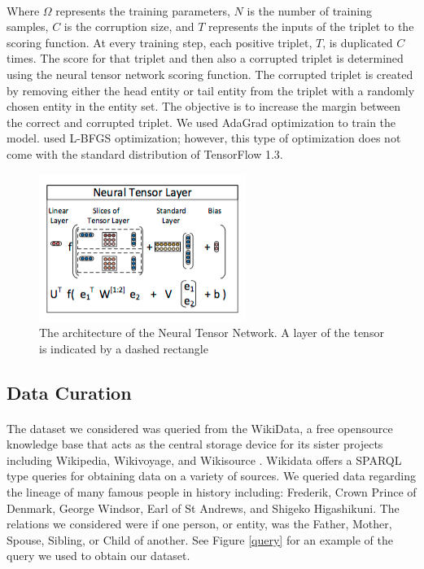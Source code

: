 \documentclass[11.5pt]{article}
\newcounter{Figure}
\newcounter{graphics}
\begin{document}
\paragraph{}  Where $ \Omega $ represents the training parameters, $N$ is the number of training samples, $C$ is the corruption size, and $T$ represents the inputs of the triplet to the scoring function. At every training step, each positive triplet, $T$, is duplicated $C$ times. The score for that triplet and then also a corrupted triplet is determined using the neural tensor network scoring function. The corrupted triplet is created by removing either the head entity or tail entity from the triplet with a randomly chosen entity in the entity set. The objective is to increase the margin between the correct and corrupted triplet. We used AdaGrad optimization to train the model. \cite{socher2013reasoning} used L-BFGS optimization; however, this type of optimization does not come with the standard distribution of TensorFlow 1.3.

 \begin{figure}[h!]
\centerline { \includegraphics[width=.5\textwidth]{report_ntn/ntn_arch.png}}
  \caption{The architecture of the Neural Tensor Network. A layer of the tensor is indicated by a dashed rectangle}
  \label{ntn_arch.png}
\end{figure}

\subsection{Data Curation}


\paragraph{} The dataset we considered was queried from the WikiData, a free opensource knowledge base that acts as the central storage device for its sister projects including Wikipedia, Wikivoyage, and Wikisource \cite{Wikidata}. Wikidata offers a SPARQL type queries for obtaining data on a variety of sources. We queried data regarding the lineage of many famous people in history including: Frederik, Crown Prince of Denmark, George Windsor, Earl of St Andrews, and Shigeko Higashikuni. The relations we considered were if one person, or entity, was the Father, Mother, Spouse, Sibling, or Child of another. See Figure \ref{query} for an example of the query we used to obtain our dataset. 
\end{document}
